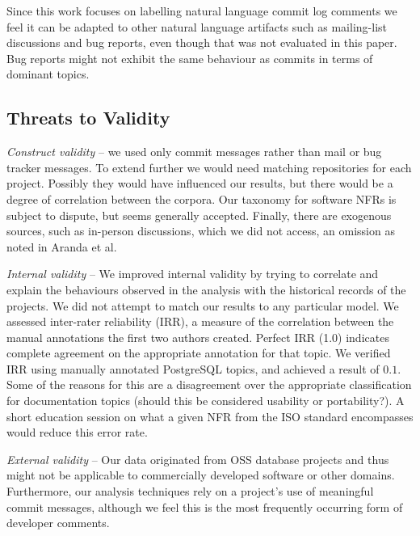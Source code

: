 \documentclass[smallextended]{svjour3}       %
\begin{document}
Since this work focuses on labelling natural language commit log
comments we feel it can be adapted to other natural language artifacts
such as mailing-list discussions and bug reports, even though that was
not evaluated in this paper. Bug reports might not exhibit the same
behaviour as commits in terms of dominant topics.

\subsection{Threats to Validity}
\emph{Construct validity} -- we used only commit messages rather than
mail or bug tracker messages. 
To extend further we would need matching repositories for each project.
Possibly they would have influenced our results, but there would be a degree of correlation between the corpora.
Our taxonomy for software NFRs is subject to dispute, but seems
generally accepted. Finally, there are exogenous sources, such as
in-person discussions, which we did not access, an omission as noted
in Aranda et al.~\cite{aranda09icse} %

\emph{Internal validity} -- %
We improved internal validity by trying to correlate and explain the behaviours observed in the analysis with the historical records of the projects.
We did not attempt to match our results to any particular model.
We assessed inter-rater reliability (IRR), a measure of the correlation between the manual annotations the first two authors created. Perfect IRR (1.0) indicates complete agreement 
on the appropriate annotation for that topic. We verified IRR using
manually annotated PostgreSQL topics, and achieved a result of $0.1$.
Some of the reasons for this are a disagreement over the appropriate classification for documentation topics (should this be considered
usability or portability?). A short education session on what a given NFR from the ISO standard encompasses would reduce this error rate.

\emph{External validity} -- %
Our data originated from OSS database projects and thus might not be applicable to commercially developed software or other domains. 
Furthermore, our analysis techniques rely on a project's use of meaningful commit messages, although we feel this is the most frequently occurring form
of developer comments. 
\end{document}
